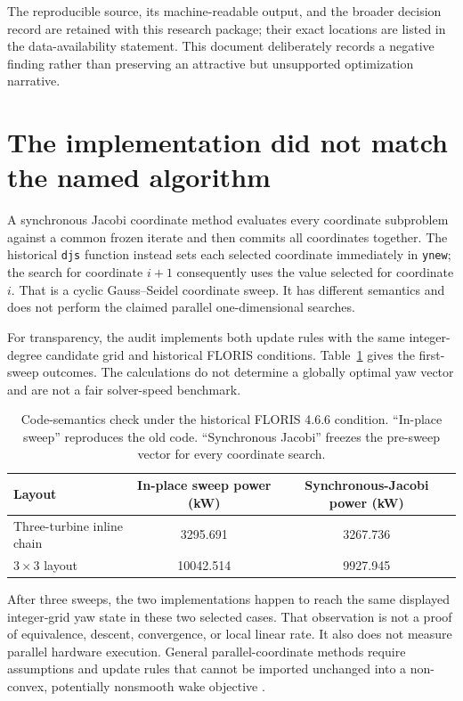 \documentclass[wes, manuscript]{copernicus}
\begin{document}
The reproducible source, its machine-readable output, and the broader decision record are retained with this research package; their exact locations are listed in the data-availability statement. This document deliberately records a negative finding rather than preserving an attractive but unsupported optimization narrative.

\section{The implementation did not match the named algorithm}
\label{sec:semantics}

A synchronous Jacobi coordinate method evaluates every coordinate subproblem against a common frozen iterate and then commits all coordinates together. The historical \texttt{djs} function instead sets each selected coordinate immediately in \texttt{ynew}; the search for coordinate $i+1$ consequently uses the value selected for coordinate $i$. That is a cyclic Gauss--Seidel coordinate sweep. It has different semantics and does not perform the claimed parallel one-dimensional searches.

For transparency, the audit implements both update rules with the same integer-degree candidate grid and historical FLORIS conditions. Table~\ref{tab:semantics} gives the first-sweep outcomes. The calculations do not determine a globally optimal yaw vector and are not a fair solver-speed benchmark.

\begin{table}[htbp]
\caption{Code-semantics check under the historical FLORIS 4.6.6 condition. ``In-place sweep'' reproduces the old code. ``Synchronous Jacobi'' freezes the pre-sweep vector for every coordinate search.}
\begin{tabular}{lcc}
\hline
Layout & In-place sweep power (kW) & Synchronous-Jacobi power (kW) \\
\hline
Three-turbine inline chain & 3295.691 & 3267.736 \\
$3\times3$ layout & 10042.514 & 9927.945 \\
\hline
\end{tabular}
\label{tab:semantics}
\end{table}

After three sweeps, the two implementations happen to reach the same displayed integer-grid yaw state in these two selected cases. That observation is not a proof of equivalence, descent, convergence, or local linear rate. It also does not measure parallel hardware execution. General parallel-coordinate methods require assumptions and update rules that cannot be imported unchanged into a non-convex, potentially nonsmooth wake objective \citep{wright2015coordinate,richtarik2016parallel,gori2023sensitivity}.
\end{document}
